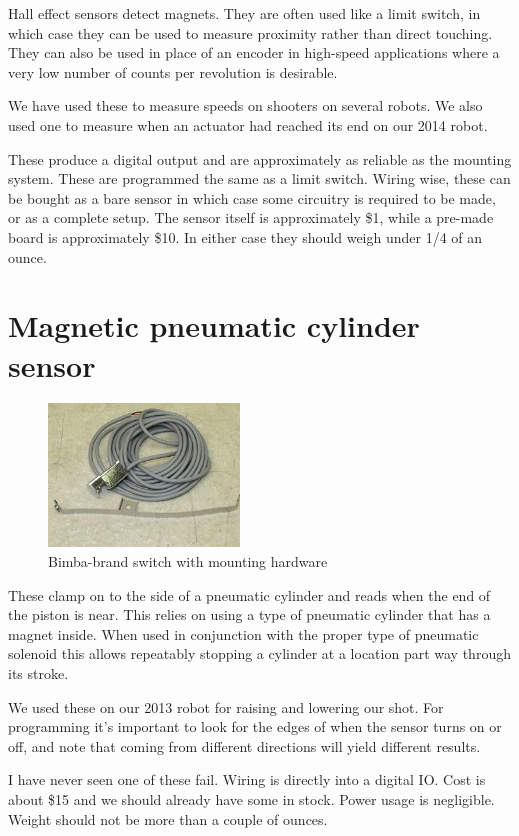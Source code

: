 \documentclass{article}
\begin{document}
Hall effect sensors detect magnets.  They are often used like a limit switch, in which case they can be used to measure proximity rather than direct touching.  They can also be used in place of an encoder in high-speed applications where a very low number of counts per revolution is desirable.  

We have used these to measure speeds on shooters on several robots.  We also used one to measure when an actuator had reached its end on our 2014 robot.  

These produce a digital output and are approximately as reliable as the mounting system.  These are programmed the same as a limit switch.  Wiring wise, these can be bought as a bare sensor in which case some circuitry is required to be made, or as a complete setup.  The sensor itself is approximately \$1, while a pre-made board is approximately \$10.  In either case they should weigh under 1/4 of an ounce.  

\section{Magnetic pneumatic cylinder sensor}
\begin{figure}[ht]
\centering
\includegraphics[width=2in]{cylinder_switch.JPG}
\caption{Bimba-brand switch with mounting hardware}
\end{figure}

These clamp on to the side of a pneumatic cylinder and reads when the end of the piston is near.  This relies on using a type of pneumatic cylinder that has a magnet inside.  When used in conjunction with the proper type of pneumatic solenoid this allows repeatably stopping a cylinder at a location part way through its stroke.  

We used these on our 2013 robot for raising and lowering our shot.  For programming it's important to look for the edges of when the sensor turns on or off, and note that coming from different directions will yield different results.  

I have never seen one of these fail.  Wiring is directly into a digital IO.  Cost is about \$15 and we should already have some in stock.  Power usage is negligible.  Weight should not be more than a couple of ounces.  
\end{document}
